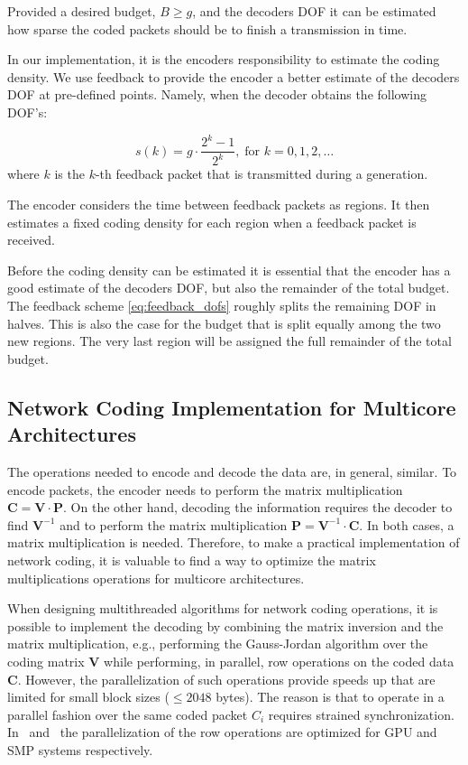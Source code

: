 Provided a desired budget, $B \geq g$, and the decoders \ac{DOF} it can be
estimated how sparse the coded packets should be to finish a transmission in
time.

In our implementation, it is the encoders responsibility to estimate the coding
density. We use feedback to provide the encoder a better estimate of the
decoders \ac{DOF} at pre-defined points. Namely, when the decoder obtains the
following \ac{DOF}'s:

\begin{equation}\label{eq:feedback_dofs}
    s(k) = g\cdot \frac{2^k -1}{2^k},  \; \text{for } k=0,1,2,\dots
\end{equation}
where $k$ is the $k$-th feedback packet that is transmitted during a generation.

The encoder considers the time between feedback packets as regions. It then
estimates a fixed coding density for each region when a feedback packet is
received.

Before the coding density can be estimated it is essential that the encoder
has a good estimate of the decoders \ac{DOF}, but also the remainder of the
total budget. The feedback scheme \ref{eq:feedback_dofs} roughly splits the
remaining \ac{DOF} in halves. This is also the case for the budget that is
split equally among the two new regions. The very last region will be assigned
the full remainder of the total budget.

\subsection{Network Coding Implementation for Multicore Architectures}
\label{sub:implementation-multicore}

The operations needed to encode and decode the data are, in general, similar. To
encode packets, the encoder needs to perform the matrix multiplication
$\textbf{C} = \textbf{V} \cdot \textbf{P}$. On the other hand, decoding the
information requires the decoder to find $\textbf{V}^{-1}$ and to perform the
matrix multiplication $\textbf{P} = \textbf{V}^{-1} \cdot \textbf{C}$. In both
cases, a matrix multiplication is needed. Therefore, to make a practical
implementation of network coding, it is valuable to find a way to optimize the
matrix multiplications operations for multicore architectures.

When designing multithreaded algorithms for network coding operations, it is
possible to implement the decoding by combining the matrix inversion and the
matrix multiplication, e.g., performing the Gauss-Jordan algorithm over the
coding matrix $\textbf{V}$ while performing, in parallel, row operations on the
coded data $\textbf{C}$. However, the parallelization of such operations provide
speeds up that are limited for small block sizes ($\leq 2048$ bytes). The reason
is that to operate in a parallel fashion over the same coded packet $C_i$
requires strained synchronization. In~\cite{5061951} and~\cite{4262451} the
parallelization of the row operations are optimized for \ac{GPU} and \ac{SMP}
systems respectively.

